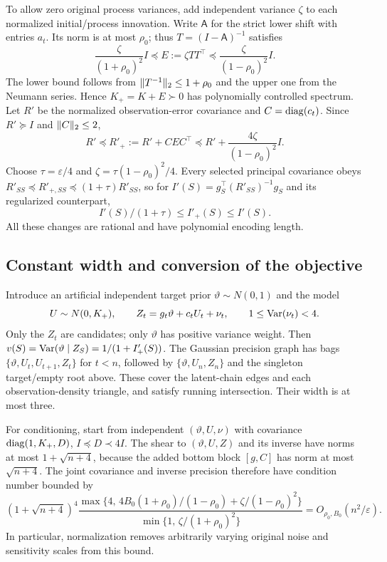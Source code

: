 To allow zero original process variances, add independent variance $\zeta$
to each normalized initial/process innovation. Write $\mathsf A$ for the
strict lower shift with entries $a_t$. Its norm is at most $\rho_0$; thus
$T=(I-\mathsf A)^{-1}$ satisfies
\[
 \frac{\zeta}{(1+\rho_0)^2}I\preceq E:=\zeta TT^\top
       \preceq\frac{\zeta}{(1-\rho_0)^2}I.
\]
The lower bound follows from $\lVert T^{-1}\rVert_2\le1+\rho_0$ and the upper
one from the Neumann series. Hence $K_+=K+E\succ0$ has polynomially
controlled spectrum. Let $R'$ be the normalized observation-error covariance
and $C=\operatorname{diag}(c_t)$. Since $R'\succeq I$ and $\lVert C\rVert_2\le2$,
\[
 R'\preceq R'_+:=R'+CEC^\top
 \preceq R'+\frac{4\zeta}{(1-\rho_0)^2}I.
\]
Choose $\tau=\varepsilon/4$ and
$\zeta=\tau(1-\rho_0)^2/4$. Every selected principal covariance obeys
$R'_{SS}\preceq R'_{+,SS}\preceq(1+\tau)R'_{SS}$, so for
$I'(S)=g_S^\top(R'_{SS})^{-1}g_S$ and its regularized counterpart,
\begin{equation}
 I'(S)/(1+\tau)\le I'_+(S)\le I'(S).
 \label{eq:gmrf-regularization}
\end{equation}
All these changes are rational and have polynomial encoding length.

\subsection{Constant width and conversion of the objective}
Introduce an artificial independent target prior $\vartheta\sim N(0,1)$
and the model
\[
 U\sim N(0,K_+),\qquad Z_t=g_t\vartheta+c_tU_t+\nu_t,
 \qquad 1\le\operatorname{Var}(\nu_t)<4.
\]
Only the $Z_t$ are candidates; only $\vartheta$ has positive variance weight.
Then $v(S)=\operatorname{Var}(\vartheta\mid Z_S)=1/(1+I'_+(S))$. The Gaussian precision
graph has bags $\{\vartheta,U_t,U_{t+1},Z_t\}$ for $t<n$, followed by
$\{\vartheta,U_n,Z_n\}$ and the singleton target/empty root above.
These cover the latent-chain edges and each observation-density triangle,
and satisfy running intersection. Their width is at most three.

For conditioning, start from independent $(\vartheta,U,\nu)$ with covariance
$\operatorname{diag}(1,K_+,D)$, $I\preceq D\prec4I$. The shear to
$(\vartheta,U,Z)$ and its inverse have norms at most
$1+\sqrt{n+4}$, because the added bottom block $[g,C]$ has norm at most
$\sqrt{n+4}$. The joint covariance and inverse precision therefore have
condition number bounded by
\begin{equation}
 (1+\sqrt{n+4})^4
 \frac{\max\{4,\,4B_0(1+\rho_0)/(1-\rho_0)
                       +\zeta/(1-\rho_0)^2\}}
      {\min\{1,\,\zeta/(1+\rho_0)^2\}}
 =O_{\rho_0,B_0}(n^2/\varepsilon).
 \label{eq:gmrf-condition}
\end{equation}
In particular, normalization removes arbitrarily varying original noise and
sensitivity scales from this bound.

